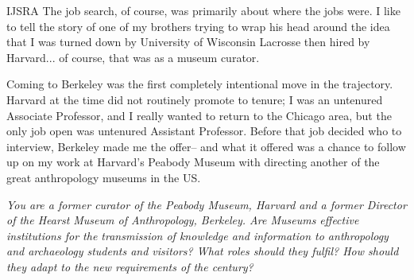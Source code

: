 \begin{labeling}{IJSRA}
The job search, of course, was primarily about where the jobs were. I like to tell the story of one of my brothers trying to wrap his head around the idea that I was turned down by University of Wisconsin Lacrosse then hired by Harvard... of course, that was as a museum curator. 

Coming to Berkeley was the first completely intentional move in the trajectory. Harvard at the time did not routinely promote to tenure; I was an untenured Associate Professor, and I really wanted to return to the Chicago area, but the only job open was untenured Assistant Professor. Before that job decided who to interview, Berkeley made me the offer-- and what it offered was a chance to follow up on my work at Harvard's Peabody Museum with directing another of the great anthropology museums in the US.


\item[IJSRA] \textit{You are a former curator of the Peabody Museum, Harvard and a former Director of the Hearst Museum of Anthropology, Berkeley. Are Museums effective institutions for the transmission of knowledge and information to anthropology and archaeology students and visitors? What roles should they fulfil? How should they adapt to the new requirements of the  century?}



\end{labeling}
